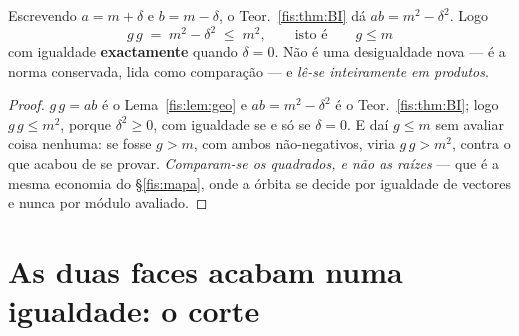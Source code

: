 \documentclass[livro.tex]{subfiles}
\begin{document}
\begin{corolario}\label{fis:cor:medias}
Escrevendo $a=m+\delta$ e $b=m-\delta$, o Teor.~\ref{fis:thm:BI} dá
$ab=m^{2}-\delta^{2}$. Logo
\[
\boxed{\;g\,g\;=\;m^{2}-\delta^{2}\;\le\;m^{2},\qquad\text{isto é}\qquad
g\le m\;}
\]
com igualdade \textbf{exactamente} quando $\delta=0$. Não é uma desigualdade nova
--- é a norma conservada, lida como comparação --- e \emph{lê-se inteiramente em
produtos}.
\end{corolario}

\begin{proof}
$g\,g=ab$ é o Lema~\ref{fis:lem:geo} e $ab=m^{2}-\delta^{2}$ é o
Teor.~\ref{fis:thm:BI}; logo $g\,g\le m^{2}$, porque $\delta^{2}\ge0$, com
igualdade se e só se $\delta=0$. E daí $g\le m$ sem avaliar coisa nenhuma: se
fosse $g>m$, com ambos não-negativos, viria $g\,g>m^{2}$, contra o que acabou de
se provar. \emph{Comparam-se os quadrados, e não as raízes} --- que é a mesma
economia do §\ref{fis:mapa}, onde a órbita se decide por igualdade de vectores e
nunca por módulo avaliado.
\end{proof}

\section{As duas faces acabam numa igualdade: o corte}\label{fis:corte}
\end{document}
